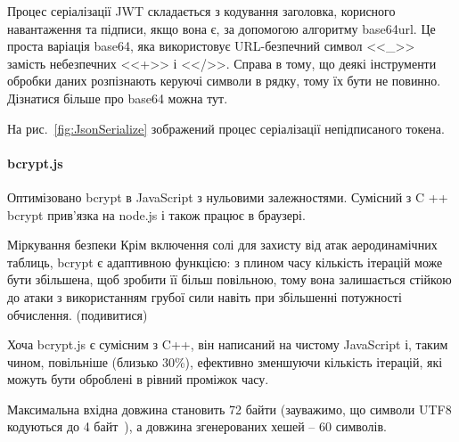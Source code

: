 Процес серіалізації JWT складається з кодування заголовка, корисного навантаження та підписи, якщо вона є, за допомогою алгоритму base64url. Це проста варіація base64, яка використовує URL-безпечний символ <<\_>> замість небезпечних <<+>> і <</>>. Справа в тому, що деякі інструменти обробки даних розпізнають керуючі символи в рядку, тому їх бути не повинно. Дізнатися більше про base64 можна тут.

На рис.~\ref{fig:JsonSerialize} зображений процес серіалізації непідписаного токена.


\paragraph{bcrypt.js}

Оптимізовано bcrypt в JavaScript з нульовими залежностями. Сумісний з C ++ bcrypt прив'язка на node.js і також працює в браузері.

Міркування безпеки
Крім включення солі для захисту від атак аеродинамічних таблиць, bcrypt є адаптивною функцією: з плином часу кількість ітерацій може бути збільшена, щоб зробити її більш повільною, тому вона залишається стійкою до атаки з використанням грубої сили навіть при збільшенні потужності обчислення. (подивитися)

Хоча bcrypt.js є сумісним з C++, він написаний на чистому JavaScript і, таким чином, повільніше (близько 30\%), ефективно зменшуючи кількість ітерацій, які можуть бути оброблені в рівний проміжок часу.

Максимальна вхідна довжина становить 72 байти (зауважимо, що символи UTF8 кодуються до 4 байт~\cite{yergeau2003utf}), а довжина згенерованих хешей -- 60 символів.
